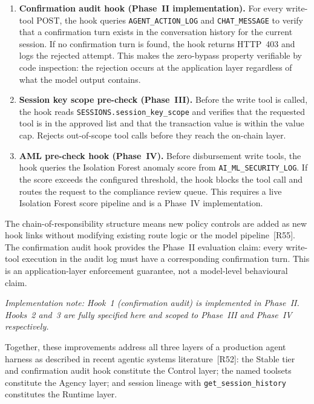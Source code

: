 \documentclass[12pt,a4paper]{report}
\begin{document}
\begin{enumerate}[noitemsep]
\item \textbf{Confirmation audit hook (Phase~II implementation).} For every
write-tool POST, the hook queries \texttt{AGENT\_ACTION\_LOG} and
\texttt{CHAT\_MESSAGE} to verify that a confirmation turn exists in the
conversation history for the current session. If no confirmation turn is found,
the hook returns HTTP~403 and logs the rejected attempt. This makes the
zero-bypass property verifiable by code inspection: the rejection occurs at the
application layer regardless of what the model output contains.

\item \textbf{Session key scope pre-check (Phase~III).} Before the write tool is
called, the hook reads \texttt{SESSIONS.session\_key\_scope} and verifies that the
requested tool is in the approved list and that the transaction value is within the
value cap. Rejects out-of-scope tool calls before they reach the on-chain layer.

\item \textbf{AML pre-check hook (Phase~IV).} Before disbursement write tools, the
hook queries the Isolation Forest anomaly score from \texttt{AI\_ML\_SECURITY\_LOG}.
If the score exceeds the configured threshold, the hook blocks the tool call and
routes the request to the compliance review queue. This requires a live Isolation
Forest score pipeline and is a Phase~IV implementation.
\end{enumerate}

\noindent The chain-of-responsibility structure means new policy controls are added
as new hook links without modifying existing route logic or the model
pipeline~[R55]. The confirmation audit hook provides the Phase~II
evaluation claim: every write-tool execution in the audit log must have a
corresponding confirmation turn. This is an application-layer enforcement
guarantee, not a model-level behavioural claim.

\textit{Implementation note: Hook~1 (confirmation audit) is implemented in
Phase~II. Hooks~2 and~3 are fully specified here and scoped to Phase~III
and Phase~IV respectively.}

\noindent Together, these improvements address all three layers of a
production agent harness as described in recent agentic systems
literature~[R52]: the Stable tier and confirmation audit
hook constitute the Control layer; the named toolsets constitute the
Agency layer; and session lineage with \texttt{get\_session\_history}
constitutes the Runtime layer.
\end{document}
